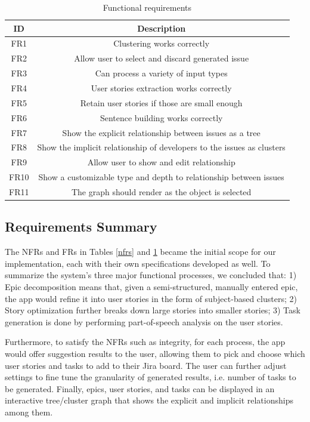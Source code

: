 \begin{table}
\centering
\caption{Functional requirements}
\label{frt}
\begin{tabular}{ |c|c| } 
\hline
\multicolumn{1}{|c|}{\textbf{ID}} & \multicolumn{1}{c|}{\textbf{Description}} \\
\hline
FR1 & Clustering works correctly \\
\hline
FR2 & Allow user to select and discard generated issue \\
\hline
FR3 & Can process a variety of input types \\
\hline
FR4 & User stories extraction works correctly \\
\hline
FR5 & Retain user stories if those are small enough \\
\hline
FR6 & Sentence building works correctly \\
\hline
FR7 & Show the explicit relationship between issues as a tree \\
\hline
FR8 & Show the implicit relationship of developers to the issues as clusters \\
\hline
FR9 & Allow user to show and edit relationship \\
\hline
FR10 & Show a customizable type and depth to relationship between issues \\
\hline
FR11 & The graph should render as the object is selected \\
\hline
\end{tabular}
\end{table}

\subsection{Requirements Summary}
The NFRs and FRs in Tables \ref{nfrs} and \ref{frt} became the initial scope for our implementation, each with their own specifications developed as well. To summarize the system's three major functional processes, we concluded that: 1) Epic decomposition means that, given a semi-structured, manually entered epic, the app would refine it into user stories in the form of subject-based clusters; 2) Story optimization further breaks down large stories into smaller stories; 3) Task generation is done by performing part-of-speech analysis on the user stories. 

Furthermore, to satisfy the NFRs such as integrity, for each process, the app would offer suggestion results to the user, allowing them to pick and choose which user stories and tasks to add to their Jira board. The user can further adjust settings to fine tune the granularity of generated results, i.e. number of tasks to be generated. Finally, epics, user stories, and tasks can be displayed in an interactive tree/cluster graph that shows the explicit and implicit relationships among them.

